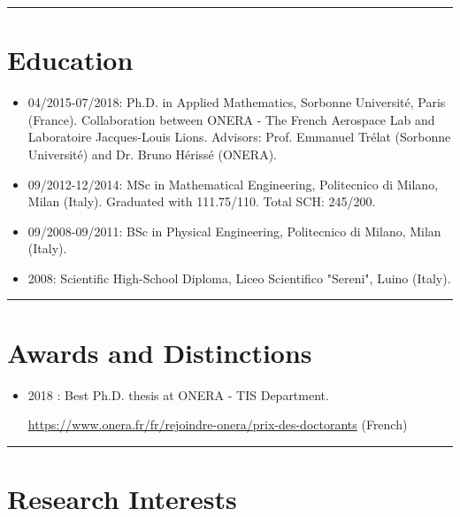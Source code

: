 \documentclass[a4paper,12pt]{article}
\begin{document}
\begingroup
\begin{center}
\noindent\rule{7cm}{0.4pt}
\end{center}
\endgroup

\section{Education}
\begin{itemize}
\item 04/2015-07/2018: Ph.D. in Applied Mathematics, Sorbonne Universit\'{e}, Paris (France). Collaboration between ONERA - The French Aerospace Lab and Laboratoire Jacques-Louis Lions. Advisors: Prof. Emmanuel Tr\'{e}lat (Sorbonne Universit\'{e}) and Dr. Bruno H\'{e}riss\'{e} (ONERA).
\item 09/2012-12/2014: MSc in Mathematical Engineering, Politecnico di Milano, Milan (Italy). Graduated with 111.75/110. Total SCH:  245/200.
\item 09/2008-09/2011: BSc in Physical Engineering, Politecnico di Milano, Milan (Italy).
\item 2008: Scientific High-School Diploma, Liceo Scientifico "Sereni", Luino (Italy).
\end{itemize}

\begingroup
\begin{center}
\noindent\rule{7cm}{0.4pt}
\end{center}
\endgroup

\section{Awards and Distinctions}
\begin{itemize}
\item 2018 : Best Ph.D. thesis at ONERA - TIS Department.

\url{https://www.onera.fr/fr/rejoindre-onera/prix-des-doctorants} (French)
\end{itemize}

\begingroup
\begin{center}
\noindent\rule{7cm}{0.4pt}
\end{center}
\endgroup

\section{Research Interests}
\end{document}
